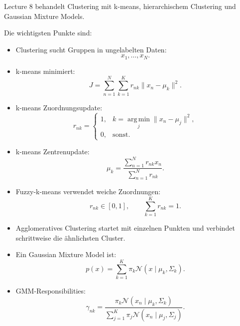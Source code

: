 \documentclass[11pt,a4paper]{scrartcl}
\begin{document}
\begin{answerbox}
    Lecture 8 behandelt Clustering mit k-means, hierarchischem Clustering und
    Gaussian Mixture Models.

    Die wichtigsten Punkte sind:

    \begin{itemize}
        \item Clustering sucht Gruppen in ungelabelten Daten:
        \[
            x_1,\dots,x_N.
        \]

        \item k-means minimiert:
        \[
            J
            =
            \sum_{n=1}^{N}
            \sum_{k=1}^{K}
            r_{nk}
            \|x_n-\mu_k\|^2.
        \]

        \item k-means Zuordnungsupdate:
        \[
            r_{nk}
            =
            \begin{cases}
                1, & k=\operatorname*{arg\,min}_{j}\|x_n-\mu_j\|^2,\\
                0, & \text{sonst}.
            \end{cases}
        \]

        \item k-means Zentrenupdate:
        \[
            \mu_k
            =
            \frac{
                \sum_{n=1}^{N}r_{nk}x_n
            }{
                \sum_{n=1}^{N}r_{nk}
            }.
        \]

        \item Fuzzy-k-means verwendet weiche Zuordnungen:
        \[
            r_{nk}\in[0,1],
            \qquad
            \sum_{k=1}^{K}r_{nk}=1.
        \]

        \item Agglomeratives Clustering startet mit einzelnen Punkten und
        verbindet schrittweise die ähnlichsten Cluster.

        \item Ein Gaussian Mixture Model ist:
        \[
            p(x)
            =
            \sum_{k=1}^{K}
            \pi_k
            \mathcal{N}(x\mid \mu_k,\Sigma_k).
        \]

        \item GMM-Responsibilities:
        \[
            \gamma_{nk}
            =
            \frac{
                \pi_k
                \mathcal{N}(x_n\mid \mu_k,\Sigma_k)
            }{
                \sum_{j=1}^{K}
                \pi_j
                \mathcal{N}(x_n\mid \mu_j,\Sigma_j)
            }.
        \]


\end{itemize}
\end{answerbox}
\end{document}
